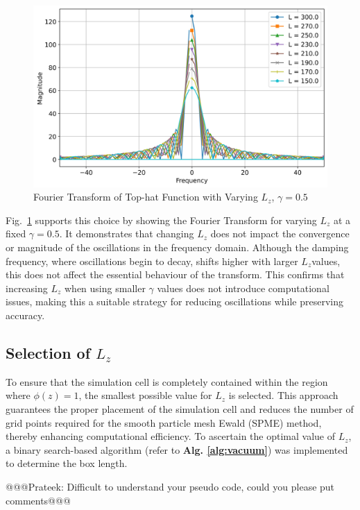 \begin{figure}[htbp]
  \centering
  \includegraphics[width=\linewidth]{images/fourieroftophatvaryL_gamma0.5.jpg}
  \caption{Fourier Transform of Top-hat Function with Varying $L_z$, $\gamma = 0.5$}
  \label{fig:fourieroftophatvaryL_gamma0}
\end{figure}

Fig.~\ref{fig:fourieroftophatvaryL_gamma0} supports this choice by showing the Fourier Transform for varying $L_z$ at a fixed $\gamma = 0.5$. It demonstrates that changing $L_z$ does not impact the convergence or magnitude of the oscillations in the frequency domain. Although the damping frequency, where oscillations begin to decay, shifts higher with larger $L_z$values, this does not affect the essential behaviour of the transform. This confirms that increasing $L_z$ when using smaller $\gamma$ values does not introduce computational issues, making this a suitable strategy for reducing oscillations while preserving accuracy.

\subsection{Selection of  $L_z$}
To ensure that the simulation cell is completely contained within the region where $\phi(z) = 1$, the smallest possible value for $L_z$ is selected. This approach guarantees the proper placement of the simulation cell and reduces the number of grid points required for the smooth particle mesh Ewald (SPME) method, thereby enhancing computational efficiency. To ascertain the optimal value of $L_z$, a binary search-based algorithm (refer to \textbf{Alg. \ref{alg:vacuum}}) was implemented to determine the box length.



@@@Prateek: Difficult to understand your pseudo code, could you please put comments@@@